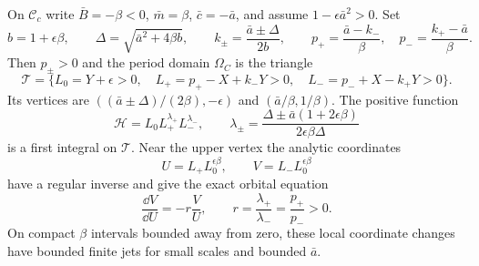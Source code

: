 \begin{lemma}\label{rw:centers:triangle}
On $\mathcal C_c$ write $\bar B=-\beta<0$,
$\bar m=\beta$, $\bar c=-\bar a$, and assume
$1-\epsilon\bar a^2>0$. Set
\[
 b=1+\epsilon\beta,\qquad
 \Delta=\sqrt{\bar a^2+4\beta b},\qquad
 k_\pm=\frac{\bar a\pm\Delta}{2b},
 \qquad
 p_+=\frac{\bar a-k_-}{\beta},\quad
 p_- =\frac{k_+-\bar a}{\beta}.
\]
Then $p_\pm>0$ and the period domain $\Omega_C$ is the triangle
\begin{equation}\label{rw:centers:triangle-domain}
 \mathcal T=\{L_0=Y+\epsilon>0,\quad
 L_+=p_+-X+k_-Y>0,\quad
 L_-=p_-+X-k_+Y>0\}.
\end{equation}
Its vertices are
$((\bar a\pm\Delta)/(2\beta),-\epsilon)$ and
$(\bar a/\beta,1/\beta)$.
The positive function
\begin{equation}\label{rw:centers:triangle-integral}
 \mathcal H=L_0L_+^{\lambda_+}L_-^{\lambda_-},\qquad
 \lambda_\pm=\frac{\Delta\pm\bar a(1+2\epsilon\beta)}
                         {2\epsilon\beta\Delta}
\end{equation}
is a first integral on $\mathcal T$.
Near the upper vertex the analytic coordinates
\[
 U=L_+L_0^{\epsilon\beta},\qquad
 V=L_-L_0^{\epsilon\beta}
\]
have a regular inverse and give the exact orbital equation
\begin{equation}\label{rw:centers:triangle-power}
 \frac{\dd V}{\dd U}=-r\frac VU,
 \qquad r=\frac{\lambda_+}{\lambda_-}=\frac{p_+}{p_-}>0.
\end{equation}
On compact $\beta$ intervals bounded away from zero, these local
coordinate changes have bounded finite jets for small scales and
bounded $\bar a$.
\end{lemma}

